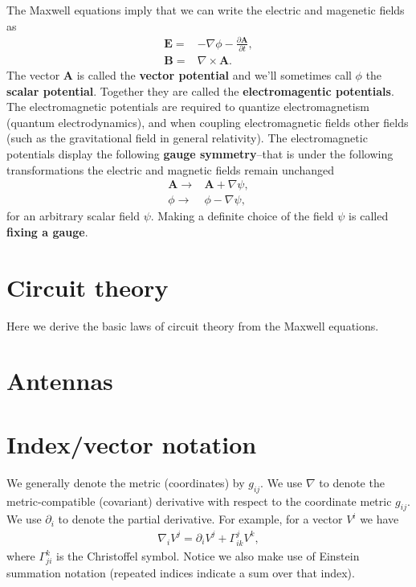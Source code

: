 \documentclass[12pt]{report}
\newcommand{\bA}{{\bm A}}
\newcommand{\bB}{{\bm B}}
\newcommand{\bE}{{\bm E}}
\begin{document}
The Maxwell equations imply that we can write the electric and magenetic fields as
\begin{align}
    \bE
    =&
    -
    \nabla\phi
    -
    \frac{\partial\bA}{\partial t}
    ,\\
    \bB
    =&
    \nabla\times\bA
    .
\end{align}
The vector $\bA$ is called the \textbf{vector potential} and we'll sometimes call $\phi$ the \textbf{scalar potential}. 
Together they are called the \textbf{electromagentic potentials}.
The electromagnetic potentials are required to quantize electromagnetism (quantum electrodynamics), and when coupling electromagnetic fields other fields (such as the gravitational field in general relativity).
The electromagnetic potentials display the following \textbf{gauge symmetry}--that is under the following transformations the electric and magnetic fields remain unchanged
\begin{align}
    \bA
    \to&
    \bA
    +
    \nabla\psi
    ,\\
    \phi
    \to&
    \phi
    -
    \nabla\psi
    ,
\end{align}
for an arbitrary scalar field $\psi$.
Making a definite choice of the field $\psi$ is called \textbf{fixing a gauge}.

\chapter{Circuit theory}

Here we derive the basic laws of circuit theory from the Maxwell equations.

\chapter{Antennas}

\appendix
\chapter{Index/vector notation}

We generally denote the metric (coordinates) by $g_{ij}$.
We use $\nabla$ to denote the metric-compatible (covariant) derivative with respect to the coordinate metric $g_{ij}$.
We use $\partial_i$ to denote the partial derivative.
For example, for a vector $V^i$ we have
\begin{align}
    \nabla_iV^j
    =
    \partial_iV^j
    +
    \Gamma^j_{ik}V^k
    ,
\end{align}
where $\Gamma^k_{ji}$ is the Christoffel symbol.
Notice we also make use of Einstein summation notation (repeated indices indicate a sum over that index).
\end{document}
